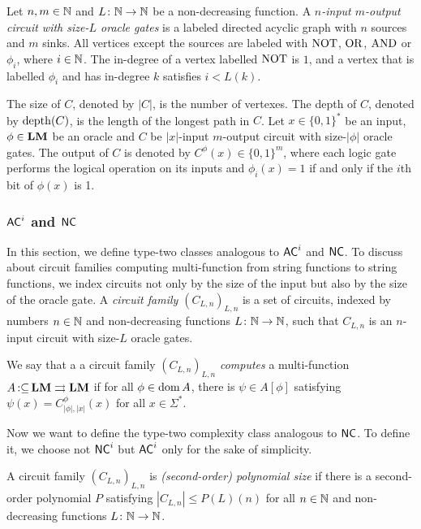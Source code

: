 \documentclass[envcountsame,orivec,oribibl]{llncs}
\newcommand{\pcolon}{\mathpunct{\,:\subseteq}}
\begin{document}
\begin{definition}
Let $n, m \in \mathbb N$ and $L \colon \mathbb N \to \mathbb N$ be a non-decreasing function.
A \emph{$n$-input $m$-output circuit with size-$L$ oracle gates} is 
a labeled directed acyclic graph with $n$ sources and $m$ sinks.
All vertices except the sources are labeled with $\mathrm{NOT}$, $\mathrm{OR}$, $\mathrm{AND}$ 
or $\phi _i$, where $i \in \mathbb N$.
The in-degree of a vertex labelled $\mathrm{NOT}$ is $1$, and
a vertex that is labelled $\phi _i$ and has in-degree $k$ 
satisfies $i < L(k)$.

The size of $C$, denoted by $|C|$, is the number of vertexes.
The depth of $C$, denoted by $\mathop{\rm depth}(C)$, is the length of the longest path in $C$.
Let $x \in \{0, 1\}^*$ be an input, $\phi \in \mathbf{LM}$ be an oracle and
$C$ be $|x|$-input $m$-output circuit with size-$|\phi|$ oracle gates.
The output of $C$ is denoted by $C^\phi(x) \in \{0, 1\}^m$,
where each logic gate performs the logical operation on its inputs
and $\phi_i(x) = 1$ if and only if the $i$th bit of $\phi(x)$ is 1.
\end{definition}


\subsubsection{$\mathsf{AC}^i$ and $\mathsf{NC}$}

In this section, we define type-two classes analogous to 
$\mathsf{AC}^i$ and $\mathsf{NC}$.
To discuss about circuit families computing multi-function from string functions to string functions,
we index circuits not only by the size of the input but also by the size of the oracle gate.
A {\em circuit family $(C_{L,n})_{L,n}$} is a set of circuits, 
indexed by numbers $n \in \mathbb N$ and non-decreasing functions $L \colon \mathbb N \to \mathbb N$,
such that $C_{L, n}$ is an $n$-input circuit with size-$L$ oracle gates.


\begin{definition}
 We say that a a circuit family $(C_{L,n})_{L,n}$ 
\emph{computes} a multi-function 
 $A \pcolon \LM \rightrightarrows \LM$ if for all $\phi \in \mathop{\rm dom} A$, 
 there is $\psi \in A[\phi]$ satisfying $\psi(x) = C_{|\phi|, |x|}^\phi(x)$
 for all $x \in \Sigma^*$.
\end{definition}

Now we want to define the type-two complexity class analogous to $\mathsf{NC}$.
To define it, we choose not $\mathsf{NC}^i$ but $\mathsf{AC}^i$ 
only for the sake of simplicity.

A circuit family $(C_{L,n})_{L,n}$ is \emph{(second-order) polynomial size}
if there is a second-order polynomial $P$ satisfying
$|C_{L,n}| \le P(L)(n)$ for all $n \in \mathbb N$ and non-decreasing functions
$L \colon \mathbb N \to \mathbb N$.
\end{document}
